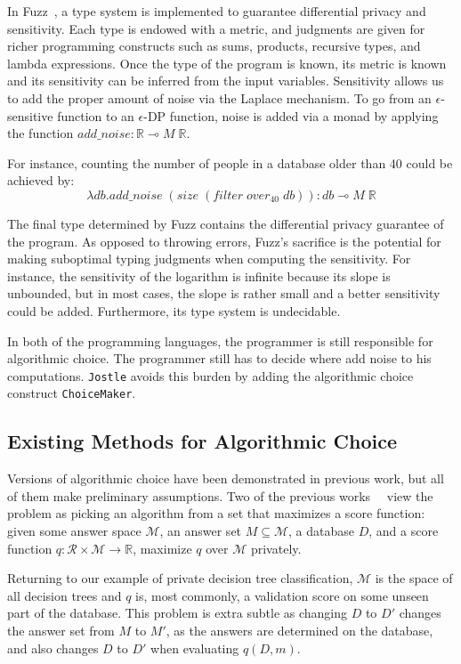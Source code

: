 \documentclass[11pt]{report}
\newcommand{\Jostle}{\texttt{Jostle}}
\renewcommand{\t}[1]{\texttt{#1}}
\begin{document}
In Fuzz~\cite{Reed:2010}, a type system is implemented to guarantee differential privacy and sensitivity. Each type is endowed with a metric, and judgments are given for richer programming constructs such as sums, products, recursive types, and lambda expressions. Once the type of the program is known, its metric is known and its sensitivity can be inferred from the input variables. Sensitivity allows us to add the proper amount of noise via the Laplace mechanism. To go from an $\epsilon$-sensitive function to an $\epsilon$-DP function, noise is added via a monad by applying the function $add\_noise : \mathbb{R} \multimap M\;\mathbb{R}$.

For instance, counting the number of people in a database older than 40 could be achieved by:
\[
\lambda db.add\_noise\;(size\;(filter\;over_{40}\;db)) : db \multimap M\;\mathbb{R}
\]

The final type determined by Fuzz contains the differential privacy guarantee of the program. As opposed to throwing errors, Fuzz's sacrifice is the potential for making suboptimal typing judgments when computing the sensitivity. For instance, the sensitivity of the logarithm is infinite because its slope is unbounded, but in most cases, the slope is rather small and a better sensitivity could be added. Furthermore, its type system is undecidable.

In both of the programming languages, the programmer is still responsible for algorithmic choice. The programmer still has to decide where add noise to his computations. \Jostle{} avoids this burden by adding the algorithmic choice construct \t{ChoiceMaker}.

\subsection{Existing Methods for Algorithmic Choice}\label{sec:algchoice}

Versions of algorithmic choice have been demonstrated in previous work, but all of them make preliminary assumptions. Two of the previous works~\cite{Chaudhuri:2013}~\cite{Ligett:2017} view the problem as picking an algorithm from a set that maximizes a score function: given some answer space $\mathcal{M}$, an answer set $M \subseteq \mathcal{M}$, a database $D$, and a score function $q: \mathcal{R} \times \mathcal{M} \rightarrow \mathbb{R}$, maximize $q$ over $\mathcal{M}$ privately.

Returning to our example of private decision tree classification, $\mathcal{M}$ is the space of all decision trees and $q$ is, most commonly, a validation score on some unseen part of the database. This problem is extra subtle as changing $D$ to $D'$ changes the answer set from $M$ to $M'$, as the answers are determined on the database, and also changes $D$ to $D'$ when evaluating $q(D, m)$.
\end{document}
